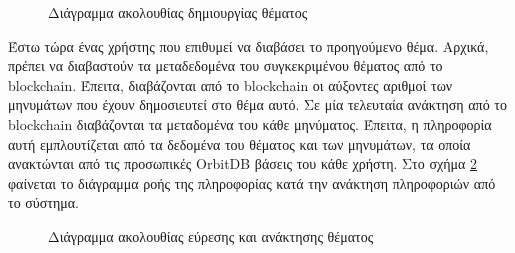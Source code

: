 \vspace{\baselineskip}

\begin{figure}[H]
    \centering
    
    \caption{Διάγραμμα ακολουθίας δημιουργίας θέματος}
    \label{figure:4-3-data-flow-insert}
\end{figure}

Έστω τώρα ένας χρήστης που επιθυμεί να διαβάσει το προηγούμενο θέμα. Αρχικά, πρέπει να διαβαστούν τα μεταδεδομένα του συγκεκριμένου θέματος από το blockchain. Έπειτα, διαβάζονται από το blockchain οι αύξοντες αριθμοί των μηνυμάτων που έχουν δημοσιευτεί στο θέμα αυτό. Σε μία τελευταία ανάκτηση από το blockchain διαβάζονται τα μεταδομένα του κάθε μηνύματος. Έπειτα, η πληροφορία αυτή εμπλουτίζεται από τα δεδομένα του θέματος και των μηνυμάτων, τα οποία ανακτώνται από τις προσωπικές OrbitDB βάσεις του κάθε χρήστη. Στο σχήμα \ref{figure:4-3-data-flow-read} φαίνεται το διάγραμμα ροής της πληροφορίας κατά την ανάκτηση πληροφοριών από το σύστημα.

\vspace{\baselineskip}

\begin{figure}[H]
    \centering
    
    \caption{Διάγραμμα ακολουθίας εύρεσης και ανάκτησης θέματος}
    \label{figure:4-3-data-flow-read}
\end{figure}
